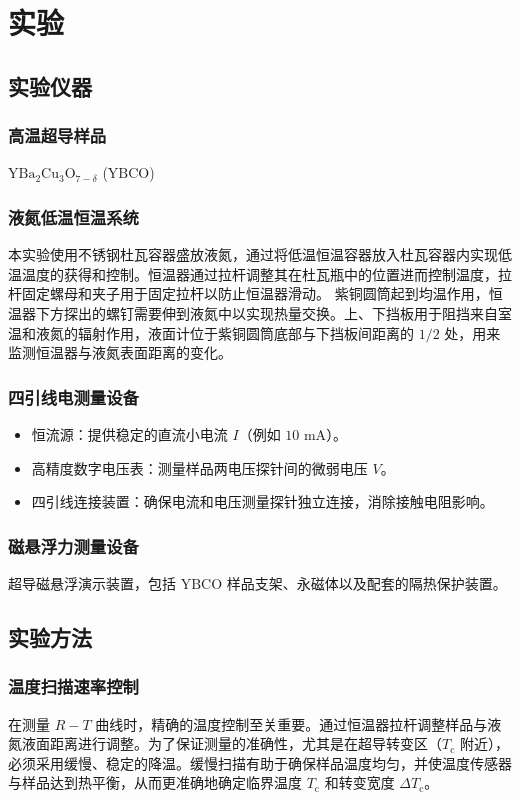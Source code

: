 \documentclass[a4paper, 1.5lines]{ctexart}
\begin{document}
    \newpage
    \section{实验}
       \label{sec:experiment} 
        \subsection{实验仪器}
        \subsubsection{高温超导样品}
            $\text{YBa}_2\text{Cu}_3\text{O}_{7-\delta}$ ($\text{YBCO}$)
        \subsubsection{液氮低温恒温系统}    
            本实验使用不锈钢杜瓦容器盛放液氮，通过将低温恒温容器放入杜瓦容器内实现低温温度的获得和控制。恒温器通过拉杆调整其在杜瓦瓶中的位置进而控制温度，拉杆固定螺母和夹子用于固定拉杆以防止恒温器滑动。
            紫铜圆筒起到均温作用，恒温器下方探出的螺钉需要伸到液氮中以实现热量交换。上、下挡板用于阻挡来自室温和液氮的辐射作用，液面计位于紫铜圆筒底部与下挡板间距离的 $\text{1/2}$ 处，用来监测恒温器与液氮表面距离的变化。
        \subsubsection{四引线电测量设备}
            \begin{itemize}
                \item 恒流源：提供稳定的直流小电流 $I$（例如 $\text{10 mA}$）。
                \item 高精度数字电压表：测量样品两电压探针间的微弱电压 $V$。
                \item 四引线连接装置：确保电流和电压测量探针独立连接，消除接触电阻影响。
            \end{itemize}
        \subsubsection{磁悬浮力测量设备}
            超导磁悬浮演示装置，包括 $\text{YBCO}$ 样品支架、永磁体以及配套的隔热保护装置。
            
        

        \subsection{实验方法}
            \subsubsection{温度扫描速率控制}
                在测量 $R-T$ 曲线时，精确的温度控制至关重要。通过恒温器拉杆调整样品与液氮液面距离进行调整。为了保证测量的准确性，尤其是在超导转变区（$T_\text{c}$ 附近），必须采用缓慢、稳定的降温。缓慢扫描有助于确保样品温度均匀，并使温度传感器与样品达到热平衡，从而更准确地确定临界温度 $T_\text{c}$ 和转变宽度 $\Delta T_\text{c}$。
\end{document}
